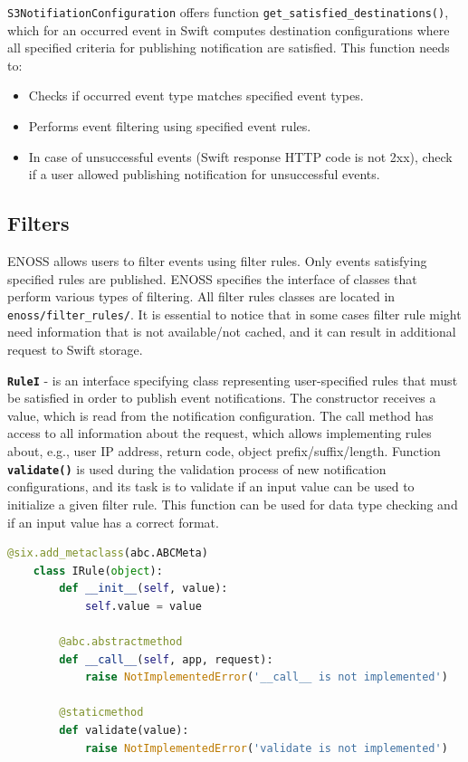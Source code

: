     \texttt{S3NotifiationConfiguration} offers function \texttt{get\_satisfied\_destinations()}, which for an occurred event in Swift computes destination configurations where all specified criteria for publishing notification are satisfied. This function needs to:
    \begin{itemize}
        \item Checks if occurred event type matches specified event types.
        \item Performs event filtering using specified event rules.
        \item In case of unsuccessful events (Swift response HTTP code is not 2xx), check if a user allowed publishing notification for unsuccessful events.
    \end{itemize}

    \subsection{Filters}
    ENOSS allows users to filter events using filter rules. Only events satisfying specified rules are published. ENOSS specifies the interface of classes that perform various types of filtering. All filter rules classes are located in \texttt{enoss/filter\_rules/}. It is essential to notice that in some cases filter rule might need information that is not available/not cached, and it can result in additional request to Swift storage.

    \textbf{\texttt{RuleI}} - is an interface specifying class representing user-specified rules that must be satisfied in order to publish event notifications. The constructor receives a value, which is read from the notification configuration. The call method has access to all information about the request, which allows implementing rules about, e.g., user IP address, return code, object prefix/suffix/length. Function \textbf{\texttt{validate()}} is used during the validation process of new notification configurations, and its task is to validate if an input value can be used to initialize a given filter rule. This function can be used for data type checking and if an input value has a correct format.

    \begin{lstlisting}[language=Python, style=pythonStyle, caption=Interface of class representing filter rule., label=lst:enoss-rulei]
    @six.add_metaclass(abc.ABCMeta)
    class IRule(object):
        def __init__(self, value):
            self.value = value

        @abc.abstractmethod
        def __call__(self, app, request):
            raise NotImplementedError('__call__ is not implemented')

        @staticmethod
        def validate(value):
            raise NotImplementedError('validate is not implemented')
    \end{lstlisting}

